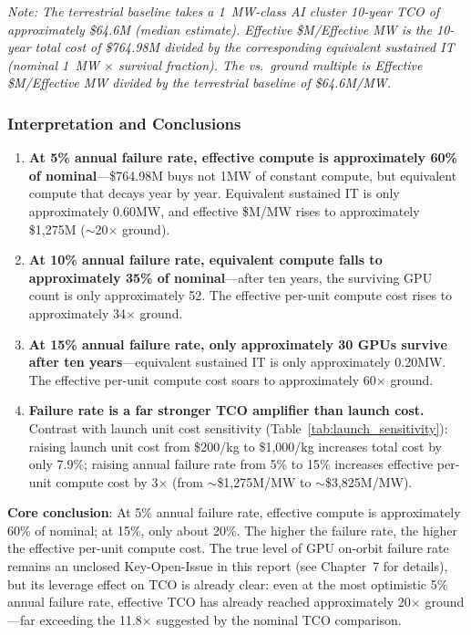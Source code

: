 \smallskip
\textit{Note: The terrestrial baseline takes a 1~MW-class AI cluster 10-year TCO of approximately \$64.6M (median estimate). Effective \$M/Effective MW is the 10-year total cost of \$764.98M divided by the corresponding equivalent sustained IT (nominal 1~MW $\times$ survival fraction). The vs.\ ground multiple is Effective \$M/Effective MW divided by the terrestrial baseline of \$64.6M/MW.}

\subsubsection{Interpretation and Conclusions}

\begin{enumerate}[leftmargin=*]
    \item \textbf{At 5\% annual failure rate, effective compute is approximately 60\% of nominal}---\$764.98M buys not 1\;MW of constant compute, but equivalent compute that decays year by year. Equivalent sustained IT is only approximately 0.60\;MW, and effective \$M/MW rises to approximately \$1,275M ($\sim$20$\times$ ground).
    \item \textbf{At 10\% annual failure rate, equivalent compute falls to approximately 35\% of nominal}---after ten years, the surviving GPU count is only approximately 52. The effective per-unit compute cost rises to approximately 34$\times$ ground.
    \item \textbf{At 15\% annual failure rate, only approximately 30 GPUs survive after ten years}---equivalent sustained IT is only approximately 0.20\;MW. The effective per-unit compute cost soars to approximately 60$\times$ ground.
    \item \textbf{Failure rate is a far stronger TCO amplifier than launch cost.} Contrast with launch unit cost sensitivity (Table~\ref{tab:launch_sensitivity}): raising launch unit cost from \$200/kg to \$1,000/kg increases total cost by only 7.9\%; raising annual failure rate from 5\% to 15\% increases effective per-unit compute cost by 3$\times$ (from $\sim$\$1,275M/MW to $\sim$\$3,825M/MW).
\end{enumerate}

\textbf{Core conclusion}: At 5\% annual failure rate, effective compute is approximately 60\% of nominal; at 15\%, only about 20\%. The higher the failure rate, the higher the effective per-unit compute cost. The true level of GPU on-orbit failure rate remains an unclosed Key-Open-Issue in this report (see Chapter~7 for details), but its leverage effect on TCO is already clear: even at the most optimistic 5\% annual failure rate, effective TCO has already reached approximately 20$\times$ ground---far exceeding the 11.8$\times$ suggested by the nominal TCO comparison.

